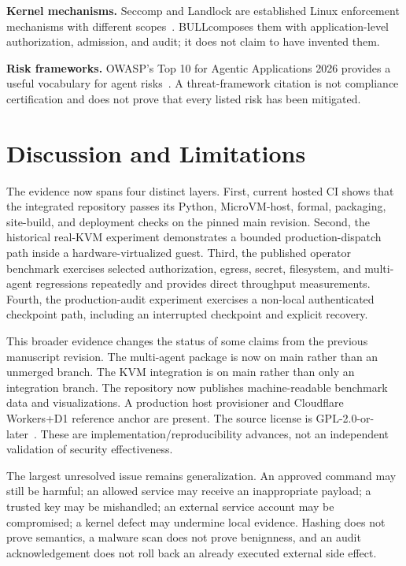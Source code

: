 \documentclass[journal]{IEEEtran}
\newcommand{\bull}{\textsc{BULL}}
\begin{document}
\textbf{Kernel mechanisms.} Seccomp and Landlock are established Linux enforcement mechanisms with different scopes~\cite{LinuxSeccomp,LinuxLandlock}. \bull composes them with application-level authorization, admission, and audit; it does not claim to have invented them.

\textbf{Risk frameworks.} OWASP's Top 10 for Agentic Applications 2026 provides a useful vocabulary for agent risks~\cite{OWASP2026}. A threat-framework citation is not compliance certification and does not prove that every listed risk has been mitigated.

\section{Discussion and Limitations}
The evidence now spans four distinct layers. First, current hosted CI shows that the integrated repository passes its Python, MicroVM-host, formal, packaging, site-build, and deployment checks on the pinned main revision. Second, the historical real-KVM experiment demonstrates a bounded production-dispatch path inside a hardware-virtualized guest. Third, the published operator benchmark exercises selected authorization, egress, secret, filesystem, and multi-agent regressions repeatedly and provides direct throughput measurements. Fourth, the production-audit experiment exercises a non-local authenticated checkpoint path, including an interrupted checkpoint and explicit recovery.

This broader evidence changes the status of some claims from the previous manuscript revision. The multi-agent package is now on main rather than an unmerged branch. The KVM integration is on main rather than only an integration branch. The repository now publishes machine-readable benchmark data and visualizations. A production host provisioner and Cloudflare Workers+D1 reference anchor are present. The source license is GPL-2.0-or-later~\cite{BULL_CurrentMain,BULL_License}. These are implementation/reproducibility advances, not an independent validation of security effectiveness.

The largest unresolved issue remains generalization. An approved command may still be harmful; an allowed service may receive an inappropriate payload; a trusted key may be mishandled; an external service account may be compromised; a kernel defect may undermine local evidence. Hashing does not prove semantics, a malware scan does not prove benignness, and an audit acknowledgement does not roll back an already executed external side effect.
\end{document}
